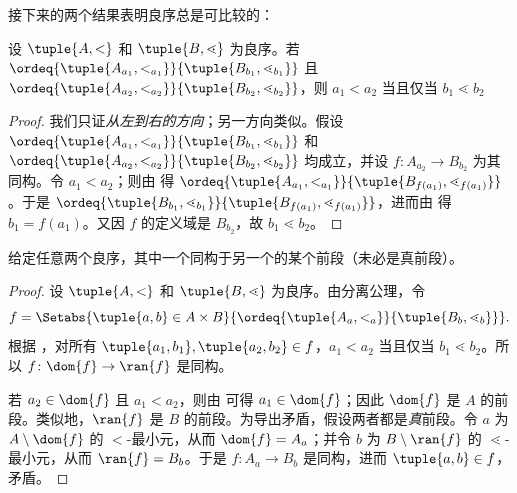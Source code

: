 \documentclass[../../../include/open-logic-section]{subfiles}
\begin{document}
接下来的两个结果表明良序总是可比较的：

\begin{lem}
设 $\tuple{A, <}$ 和 $\tuple{B, \lessdot}$ 为良序。若 $\ordeq{\tuple{A_{a_1}, <_{a_1}}}{\tuple{B_{b_1}, \lessdot_{b_1}}}$ 且 $\ordeq{\tuple{A_{{a_2}}, <_{a_2}}}{\tuple{B_{{b_2}},
\lessdot_{b_2}}}$，则 ${a_1}  < {a_2} \text{ 当且仅当 }{b_1} \lessdot
{b_2}$
\end{lem}

\begin{proof}
我们只证\emph{从左到右的方向}；另一方向类似。假设 $\ordeq{\tuple{A_{a_1}, <_{a_1}}}{\tuple{B_{b_1},
\lessdot_{b_1}}}$ 和 $\ordeq{\tuple{A_{{a_2}},
<_{a_2}}}{\tuple{B_{{b_2}}, \lessdot_{b_2}}}$ 均成立，并设 $f \colon
A_{{a_2}} \to B_{{b_2}}$ 为其同构。令 ${a_1} < {a_2}$；则由  得 $\ordeq{\tuple{A_{a_1}, <_{a_1}}}{\tuple{B_{f({a_1})},
\lessdot_{f({a_1})}}}$。于是 $\ordeq{\tuple{B_{b_1}, \lessdot_{b_1}}}{\tuple{B_{f({a_1})},
\lessdot_{f({a_1})}}}$，进而由  得 ${b_1} = f({a_1})$。又因 $f$ 的定义域是 $B_{{b_2}}$，故 ${b_1} \lessdot {b_2}$。
\end{proof}

\begin{thm}
给定任意两个良序，其中一个同构于另一个的某个前段（未必是真前段）。
\end{thm}

\begin{proof}
设 $\tuple{A, <}$ 和 $\tuple{B, \lessdot}$ 为良序。由分离公理，令
\[
	f = \Setabs{\tuple{a, b} \in A \times B}{
		\ordeq{\tuple{A_a, <_a}}{\tuple{B_b, \lessdot_b}}}.
\]
根据 ，对所有 $\tuple{a_1, b_1}, \tuple{a_2, b_2} \in f$，$a_1 < a_2$ 当且仅当 $b_1 \lessdot b_2$。所以 $f \colon \dom{f} \to
\ran{f}$ 是同构。

若 $a_2 \in \dom{f}$ 且 $a_1 < a_2$，则由  可得 $a_1 \in \dom{f}$；因此 $\dom{f}$ 是 $A$ 的前段。类似地，$\ran{f}$ 是 $B$ 的前段。为导出矛盾，假设两者都是\emph{真}前段。令 $a$ 为 $A \setminus \dom{f}$ 的 $<$-最小元，从而 $\dom{f} = A_a$；并令 $b$ 为 $B \setminus \ran{f}$ 的 $\lessdot$-最小元，从而 $\ran{f} = B_b$。于是 $f \colon A_a \to B_b$ 是同构，进而 $\tuple{a, b} \in f$，矛盾。
\end{proof}
\end{document}

